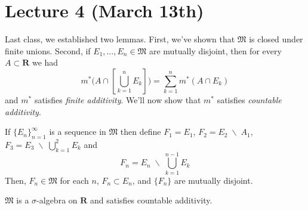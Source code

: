 \section{Lecture 4 (March 13th)}
\begin{recall}
Last class, we established two lemmas. First, we've shown that $\mathfrak{M}$ is closed under finite unions. Second, if $E_1,\ldots ,E_{n}\in \mathfrak{M}$ are mutually disjoint, then for every $A\subset {\bm R}$ we had
\[m^{*}\Big(A\cap [\bigcup ^{n}_{k=1}E_{k}]\Big)=\sum ^{n}_{k=1}m^{*}(A\cap E_{k})\]
and $m^{*}$ satisfies {\it finite additivity}. We'll now show that $m^{*}$ satisfies {\it countable additivity}.
\end{recall}
\vspace{2ex}
\begin{rmk}
If $\{E_{n}\}^{\infty }_{n=1}$ is a sequence in $\mathfrak{M}$ then define $F_{1}=E_1$, $F_2=E_2\;\backslash\;A_1$, $F_3=E_3\;\backslash\; \bigcup _{k=1}^{2}E_{k}$ and
\[F_{n}=E_{n}\;\backslash\;\bigcup ^{n-1}_{k=1}E_{k}\]
Then, $F_{n}\in \mathfrak{M}$ for each $n$, $F_{n}\subset E_{n}$, and $\{F_{n}\}$ are mutually disjoint. 
\end{rmk}
\vspace{2ex}
\begin{thm}
$\mathfrak{M}$ is a $\sigma $-algebra on ${\bm R}$ and satisfies countable additivity.
\end{thm}
\vspace{2ex}
